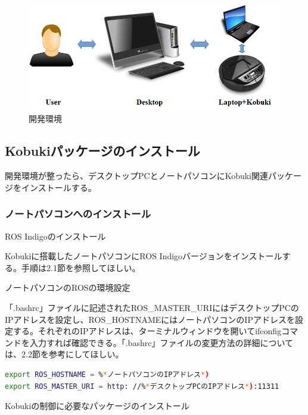 \begin{itemize}
\begin{figure}[ht]
  \centering
  \includegraphics[width=\columnwidth]{pictures/chapter9/pic_09_11.png}
  \caption{開発環境}
\end{figure}

\subsection{Kobukiパッケージのインストール}

開発環境が整ったら、デスクトップPCとノートパソコンにKobuki関連パッケージをインストールする。

\subsubsection{ノートパソコンへのインストール}

\setcounter{num}{0}

\circled{\thenum} ROS Indigoのインストール

Kobukiに搭載したノートパソコンにROS Indigoバージョンをインストールする。手順は2.1節を参照してほしい。

\circled{\thenum} ノートパソコンのROSの環境設定

「.bashrc」ファイルに記述されたROS\_MASTER\_URIにはデスクトップPCのIPアドレスを設定し、ROS\_HOSTNAMEにはノートパソコンのIPアドレスを設定する。それぞれのIPアドレスは、ターミナルウィンドウを開いてifconfigコマンドを入力すれば確認できる。「.bashrc」ファイルの変更方法の詳細については、2.2節を参考にしてほしい。

\begin{lstlisting}[language=bash]
export ROS_HOSTNAME = %*ノートパソコンのIPアドレス*)
export ROS_MASTER_URI = http: //%*デスクトップPCのIPアドレス*):11311
\end{lstlisting}

\circled{\thenum} Kobukiの制御に必要なパッケージのインストール


\end{itemize}
